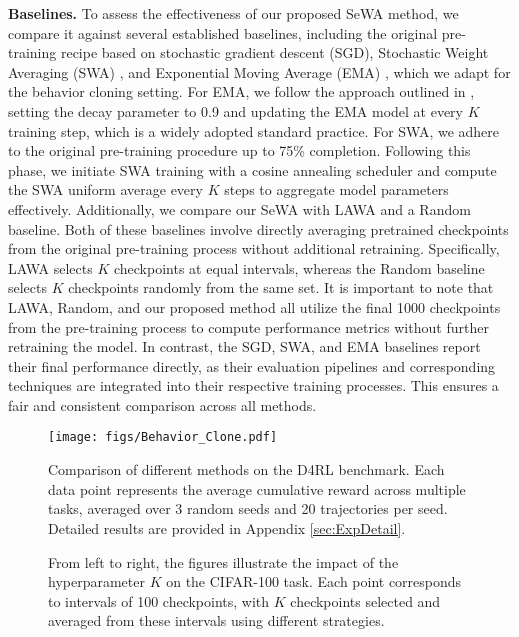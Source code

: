 \textbf{Baselines.} 
%
To assess the effectiveness of our proposed SeWA method, we compare it against several established baselines, including the original pre-training recipe based on stochastic gradient descent (SGD), Stochastic Weight Averaging (SWA) \citep{izmailov2018averaging}, and Exponential Moving Average (EMA) \citep{szegedy2016rethinking}, which we adapt for the behavior cloning setting.
%
For EMA, we follow the approach outlined in \citet{kaddour2022stop}, setting the decay parameter to 0.9 and updating the EMA model at every $K$ training step, which is a widely adopted standard practice. 
%
For SWA, we adhere to the original pre-training procedure up to 75\% completion. Following this phase, we initiate SWA training with a cosine annealing scheduler and compute the SWA uniform average every $K$ steps to aggregate model parameters effectively.
%
Additionally, we compare our SeWA with LAWA \citep{sanyal2023early} and a Random baseline. 
Both of these baselines involve directly averaging pretrained checkpoints from the original pre-training process without additional retraining. Specifically, LAWA selects $K$ checkpoints at equal intervals, whereas the Random baseline selects $K$  checkpoints randomly from the same set.
%
It is important to note that LAWA, Random, and our proposed method all utilize the final 1000 checkpoints from the pre-training process to compute performance metrics without further retraining the model.
In contrast, the SGD, SWA, and EMA baselines report their final performance directly, as their evaluation pipelines and corresponding techniques are integrated into their respective training processes. This ensures a fair and consistent comparison across all methods.

\begin{figure}
    \centering
    \texttt{[image: figs/Behavior\_Clone.pdf]}
    \vspace{-.4cm}
    \caption{Comparison of different methods on the D4RL benchmark. Each data point represents the average cumulative reward across multiple tasks, averaged over 3 random seeds and 20 trajectories per seed. Detailed results are provided in Appendix \ref{sec:ExpDetail}.}
    \label{fig:BC}
\end{figure}

\begin{figure*}[t!]
    \centering
    \centering
    \vspace{-0.2cm}
    \caption{From left to right, the figures illustrate the impact of the hyperparameter $K$ on the CIFAR-100 task. Each point corresponds to intervals of 100 checkpoints, with $K$ checkpoints selected and averaged from these intervals using different strategies.
    }
    \label{fig:cifar100}
\end{figure*}

